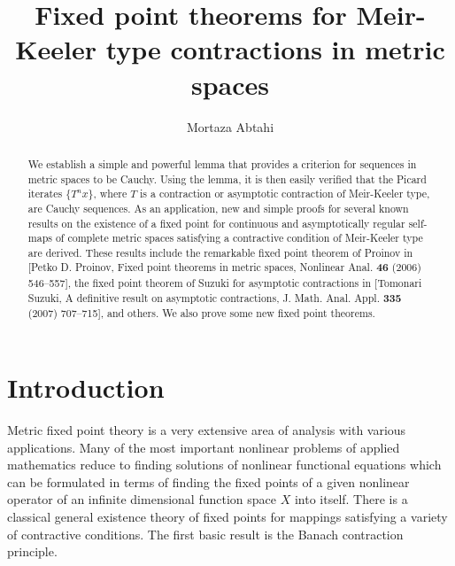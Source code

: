 \documentclass[a4paper,10pt,twoside,reqno]{amsart}
\theoremstyle{definition}
\theoremstyle{remark}
\numberwithin{equation}{section}
\begin{document}
\title[Fixed point theorems for Meir-Keeler type contractions]%
{Fixed point theorems for Meir-Keeler type contractions in metric spaces}

\author[M. Abtahi]{Mortaza Abtahi}

\address{School of Mathematics and Computer Sciences,
Damghan University, Damghan, P.O.BOX 36715-364, Iran}





\begin{abstract}
  We establish a simple and powerful lemma that provides a criterion for
  sequences in metric spaces to be Cauchy. Using the lemma, it is then easily
  verified that the Picard iterates $\{T^nx\}$, where
  $T$ is a contraction or asymptotic contraction of Meir-Keeler type,
  are Cauchy sequences.
  As an application, new and simple proofs for
  several known results on the existence of a fixed point for continuous
  and asymptotically regular self-maps of complete metric spaces satisfying
  a contractive condition of Meir-Keeler type are derived. These results include
  the remarkable fixed point theorem of Proinov in
  [Petko D. Proinov, Fixed point theorems in metric spaces,
  Nonlinear Anal. \textbf{46} (2006) 546--557],
  the fixed point theorem of Suzuki for asymptotic contractions
  in [Tomonari Suzuki, A definitive result on asymptotic contractions,
  J. Math. Anal. Appl. \textbf{335} (2007) 707--715], and others.
  We also prove some new fixed point theorems.
\end{abstract}

\maketitle

\section{Introduction}
\label{sec:intro}

Metric fixed point theory is a very extensive area of analysis with various applications.
Many of the most important nonlinear problems of applied mathematics reduce to
finding solutions of nonlinear functional equations which can be formulated
in terms of finding the fixed points of a given nonlinear operator of an infinite
dimensional function space $X$ into itself. There is a classical general existence
theory of fixed points for mappings satisfying a variety of contractive conditions.
The first basic result is the Banach contraction principle.
\end{document}
